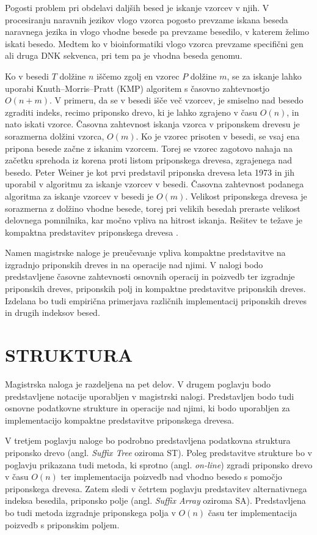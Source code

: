 Pogosti problem pri obdelavi daljših besed je iskanje vzorcev v njih. V procesiranju naravnih jezikov vlogo vzorca pogosto prevzame iskana beseda naravnega jezika in vlogo vhodne besede pa prevzame besedilo, v katerem želimo iskati besedo. Medtem ko v bioinformatiki vlogo vzorca prevzame specifični gen ali druga DNK sekvenca, pri tem pa je vhodna beseda genomu. 

Ko v besedi $T$ dolžine $n$ iščemo zgolj en vzorec $P$ dolžine $m$, se za iskanje lahko uporabi Knuth–Morris–Pratt (KMP) algoritem s časovno zahtevnostjo $O(n+m)$. V primeru, da se v besedi išče več vzorcev, je smiselno nad besedo zgraditi indeks, recimo priponsko drevo, ki je lahko zgrajeno v času $O(n)$, in nato iskati vzorce. Časovna zahtevnost iskanja vzorca v priponskem drevesu je sorazmerna dolžini vzorca, $O(m)$. Ko je vzorec prisoten v besedi, se vsaj ena pripona besede začne z iskanim vzorcem. 
Torej se vzorec zagotovo nahaja na začetku sprehoda iz korena proti listom priponskega drevesa, zgrajenega nad besedo. 
Peter Weiner je kot prvi predstavil priponska drevesa leta 1973 \cite{Weiner1973} in jih uporabil v algoritmu za iskanje vzorcev v besedi. Časovna zahtevnost podanega algoritma za iskanje vzorcev v besedi je $O(m)$. Velikost priponskega drevesa je sorazmerna z dolžino vhodne besede, torej pri velikih besedah preraste velikost delovnega pomnilnika, kar močno vpliva na hitrost iskanja. Rešitev te težave je kompaktna predstavitev priponskega drevesa \cite{Navarro2016}.

Namen magistrske naloge je preučevanje vpliva kompaktne predstavitve na izgradnjo priponskih dreves in na operacije nad njimi. V nalogi bodo predstavljene časovne zahtevnosti osnovnih operacij in poizvedb ter izgradnje priponskih dreves, priponskih polj in kompaktne predstavitve priponskih dreves. Izdelana bo tudi empirična primerjava različnih implementacij priponskih dreves in drugih indeksov besed.

\section{STRUKTURA}\label{sec:struktura}

Magistrska naloga je razdeljena na pet delov. V drugem poglavju bodo predstavljene notacije uporabljen v magistrski nalogi. Predstavljen bodo tudi osnovne podatkovne strukture in operacije nad njimi, ki bodo uporabljen za implementacijo kompaktne predstavitve priponskega drevesa.

V tretjem poglavju naloge bo podrobno predstavljena podatkovna struktura priponsko drevo (angl. \textit{Suffix Tree} oziroma ST). Poleg predstavitve strukture bo v poglavju prikazana tudi metoda, ki sprotno (angl. \textit{on-line}) zgradi priponsko drevo v času $O(n)$ ter implementacija poizvedb nad vhodno besedo s pomočjo priponskega drevesa. Zatem sledi v četrtem poglavju predstavitev alternativnega indeksa besedila, priponsko polje (angl. \textit{Suffix Array} oziroma SA). Predstavljena bo tudi metoda izgradnje priponskega polja v $O(n)$ času ter implementacija poizvedb s priponskim poljem.

